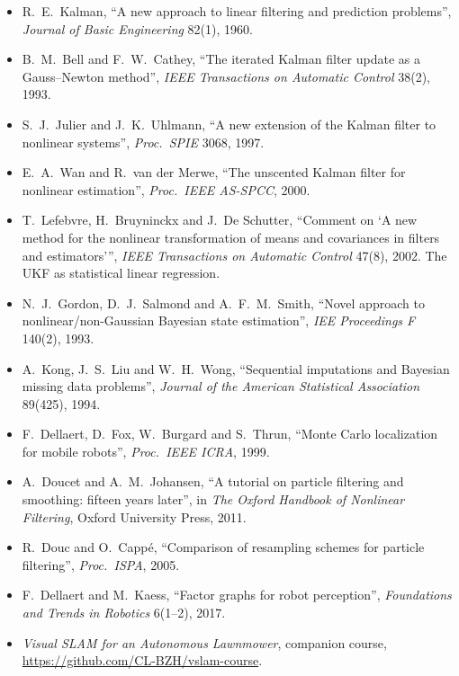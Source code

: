 \begin{itemize}[nosep,leftmargin=1.5em]
\item R.~E.~Kalman, ``A new approach to linear filtering and prediction
  problems'', \emph{Journal of Basic Engineering} 82(1), 1960.
\item B.~M.~Bell and F.~W.~Cathey, ``The iterated Kalman filter update as
  a Gauss--Newton method'', \emph{IEEE Transactions on Automatic Control}
  38(2), 1993.
\item S.~J.~Julier and J.~K.~Uhlmann, ``A new extension of the Kalman
  filter to nonlinear systems'', \emph{Proc.\ SPIE} 3068, 1997.
\item E.~A.~Wan and R.~van der Merwe, ``The unscented Kalman filter for
  nonlinear estimation'', \emph{Proc.\ IEEE AS-SPCC}, 2000.
\item T.~Lefebvre, H.~Bruyninckx and J.~De Schutter, ``Comment on `A new
  method for the nonlinear transformation of means and covariances in
  filters and estimators''', \emph{IEEE Transactions on Automatic Control}
  47(8), 2002. The UKF as statistical linear regression.
\end{itemize}
\begin{itemize}[nosep,leftmargin=1.5em]
\item N.~J.~Gordon, D.~J.~Salmond and A.~F.~M.~Smith, ``Novel approach to
  nonlinear/non-Gaussian Bayesian state estimation'', \emph{IEE
  Proceedings F} 140(2), 1993.
\item A.~Kong, J.~S.~Liu and W.~H.~Wong, ``Sequential imputations and
  Bayesian missing data problems'', \emph{Journal of the American
  Statistical Association} 89(425), 1994.
\item F.~Dellaert, D.~Fox, W.~Burgard and S.~Thrun, ``Monte Carlo
  localization for mobile robots'', \emph{Proc.\ IEEE ICRA}, 1999.
\item A.~Doucet and A.~M.~Johansen, ``A tutorial on particle filtering and
  smoothing: fifteen years later'', in \emph{The Oxford Handbook of
  Nonlinear Filtering}, Oxford University Press, 2011.
\item R.~Douc and O.~Capp\'e, ``Comparison of resampling schemes for
  particle filtering'', \emph{Proc.\ ISPA}, 2005.
\end{itemize}
\begin{itemize}[nosep,leftmargin=1.5em]
\item F.~Dellaert and M.~Kaess, ``Factor graphs for robot perception'',
  \emph{Foundations and Trends in Robotics} 6(1--2), 2017.
\item \emph{Visual SLAM for an Autonomous Lawnmower}, companion course,
  \url{https://github.com/CL-BZH/vslam-course}.
\end{itemize}
